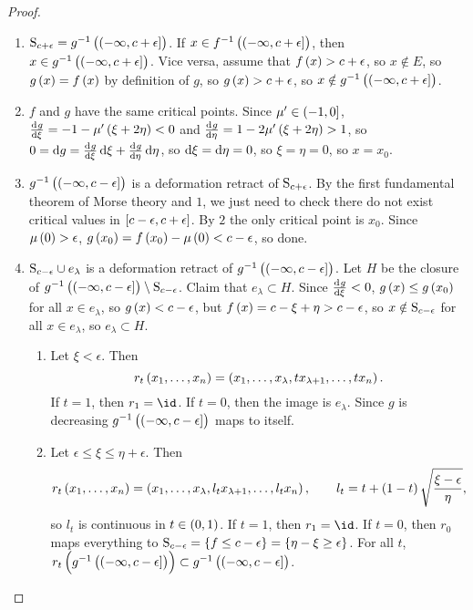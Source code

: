 \begin{proof}

\begin{enumerate}
\item $ \S_{c + \epsilon} = g^{-1}\br{\intoc{-\infty, c + \epsilon}} $. If $ x \in f^{-1}\br{\intoc{-\infty, c + \epsilon}} $, then $ x \in g^{-1}\br{\intoc{-\infty, c + \epsilon}} $. Vice versa, assume that $ f\br{x} > c + \epsilon $, so $ x \notin E $, so $ g\br{x} = f\br{x} $ by definition of $ g $, so $ g\br{x} > c + \epsilon $, so $ x \notin g^{-1}\br{\intoc{-\infty, c + \epsilon}} $.
\item $ f $ and $ g $ have the same critical points. Since $ \mu' \in \intoc{-1, 0} $, $ \tod{g}{\xi} = -1 - \mu'\br{\xi + 2\eta} < 0 $ and $ \tod{g}{\eta} = 1 - 2\mu'\br{\xi + 2\eta} > 1 $, so $ 0 = \d g = \tod{g}{\xi}\d\xi + \tod{g}{\eta}\d\eta $, so $ \d\xi = \d\eta = 0 $, so $ \xi = \eta = 0 $, so $ x = x_0 $.
\item $ g^{-1}\br{\intoc{-\infty, c - \epsilon}} $ is a deformation retract of $ \S_{c + \epsilon} $. By the first fundamental theorem of Morse theory and $ 1 $, we just need to check there do not exist critical values in $ \sbr{c - \epsilon, c + \epsilon} $. By $ 2 $ the only critical point is $ x_0 $. Since $ \mu\br{0} > \epsilon $, $ g\br{x_0} = f\br{x_0} - \mu\br{0} < c - \epsilon $, so done.
\item $ \S_{c - \epsilon} \cup e_\lambda $ is a deformation retract of $ g^{-1}\br{\intoc{-\infty, c - \epsilon}} $. Let $ H $ be the closure of $ g^{-1}\br{\intoc{-\infty, c - \epsilon}} \setminus \S_{c - \epsilon} $. Claim that $ e_\lambda \subset H $. Since $ \tod{g}{\xi} < 0 $, $ g\br{x} \le g\br{x_0} $ for all $ x \in e_\lambda $, so $ g\br{x} < c - \epsilon $, but $ f\br{x} = c - \xi + \eta > c - \epsilon $, so $ x \notin \S_{c - \epsilon} $ for all $ x \in e_\lambda $, so $ e_\lambda \subset H $.
\begin{enumerate}[label=Case \arabic*., leftmargin=0.5in]
\item Let $ \xi < \epsilon $. Then
$$ r_t\br{x_1, \dots, x_n} = \br{x_1, \dots, x_\lambda, tx_{\lambda + 1}, \dots, tx_n}. $$
If $ t = 1 $, then $ r_1 = \id $. If $ t = 0 $, then the image is $ e_\lambda $. Since $ g $ is decreasing $ g^{-1}\br{\intoc{-\infty, c - \epsilon}} $ maps to itself.
\item Let $ \epsilon \le \xi \le \eta + \epsilon $. Then
$$ r_t\br{x_1, \dots, x_n} = \br{x_1, \dots, x_\lambda, l_tx_{\lambda + 1}, \dots, l_tx_n}, \qquad l_t = t + \br{1 - t}\sqrt{\dfrac{\xi - \epsilon}{\eta}}, $$
so $ l_t $ is continuous in $ t \in \br{0, 1} $. If $ t = 1 $, then $ r_1 = \id $. If $ t = 0 $, then $ r_0 $ maps everything to $ \S_{c - \epsilon} = \cbr{f \le c - \epsilon} = \cbr{\eta - \xi \ge \epsilon} $. For all $ t $, $ r_t\br{g^{-1}\br{\intoc{-\infty, c - \epsilon}}} \subset g^{-1}\br{\intoc{-\infty, c - \epsilon}} $.

\end{enumerate}
\end{enumerate}
\end{proof}
